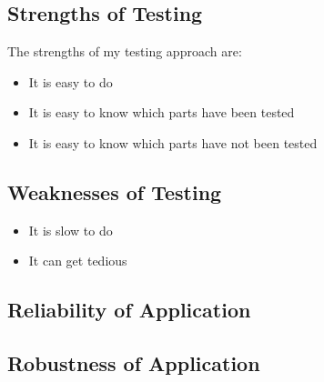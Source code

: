 \subsection{Strengths of Testing}
The strengths of my testing approach are:
\begin{itemize}
	\item It is easy to do
	\item It is easy to know which parts have been tested
	\item It is easy to know which parts have not been tested
\end{itemize}
	
\subsection{Weaknesses of Testing}
\begin{itemize}
	\item It is slow to do
	\item It can get tedious
\end{itemize}

\subsection{Reliability of Application}

\subsection{Robustness of Application}